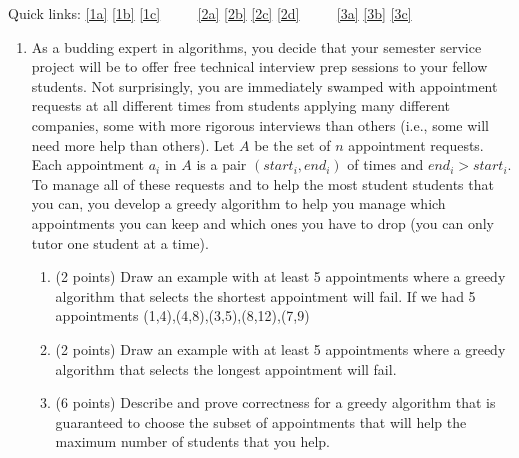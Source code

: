 \documentclass[12pt]{article}
\begin{document}
\renewcommand{\headrulewidth}{0.5pt}
\phantom{Test}

Quick links: \ref{1a} \ref{1b} \ref{1c} $\qquad$ \ref{2a} \ref{2b} \ref{2c} \ref{2d} $\qquad$ \ref{3a} \ref{3b} \ref{3c} 

\vspace{-3mm}
\begin{enumerate}

\item %
As a budding expert in algorithms, you decide that your semester service
project will be to offer free technical interview prep sessions to your fellow
students. Not surprisingly, you are immediately swamped with appointment
requests at all different times from students applying many
different companies, some with more rigorous interviews than others
(i.e., some will need more help than others). Let $A$ be the set of $n$
appointment requests. Each appointment $a_i$ in $A$ is a pair 
$(start_i, end_i)$ of times and $end_i>start_i$. To manage all of these
requests and to help the most student students that you can, you
develop a greedy algorithm to help you manage which appointments you can keep
and which ones you have to drop (you can only tutor one student at a
time).  

\pagebreak
\begin{enumerate}
    \item \label{1a} (2 points) Draw an example with at least 5 appointments where a greedy algorithm
    that selects the shortest appointment will fail.
\n If we had 5 appointments {(1,4),(4,8),(3,5),(8,12),(7,9)} \n

\pagebreak
\item \label{1b} (2 points) Draw an example with at least 5 appointments where a greedy algorithm
    that selects the longest appointment will fail.
\pagebreak
\item \label{1c} (6 points) Describe and prove correctness for a greedy algorithm that is guaranteed
    to choose the subset of appointments that will help the maximum number of
    students that you help.
\pagebreak
\end{enumerate}


\end{enumerate}
\end{document}
